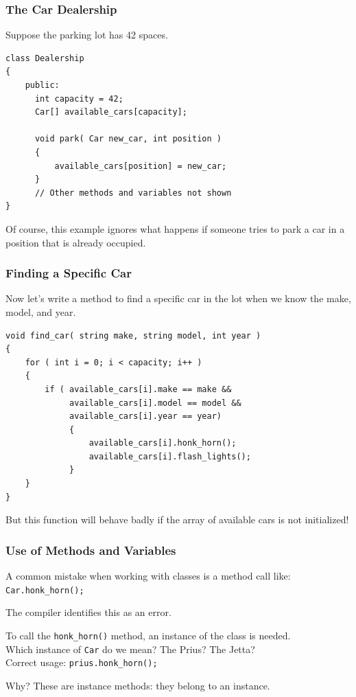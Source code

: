 \begin{frame}[fragile]
\frametitle{The Car Dealership}

Suppose the parking lot has 42 spaces.

\begin{verbatim}
class Dealership
{
    public:
      int capacity = 42;
      Car[] available_cars[capacity];

      void park( Car new_car, int position )
      {
          available_cars[position] = new_car;
      }
      // Other methods and variables not shown
}
\end{verbatim}

Of course, this example ignores what happens if someone tries to park a car in a position that is already occupied.

\end{frame}


\begin{frame}[fragile]
\frametitle{Finding a Specific Car}

Now let's write a method to find a specific car in the lot when we know the make, model, and year.

{\small
\begin{verbatim}
void find_car( string make, string model, int year )
{
    for ( int i = 0; i < capacity; i++ )
    {
        if ( available_cars[i].make == make &&
             available_cars[i].model == model &&
             available_cars[i].year == year)
             {
                 available_cars[i].honk_horn();
                 available_cars[i].flash_lights();
             }
    }
}
\end{verbatim}
}

But this function will behave badly if the array of available cars is not initialized!

\end{frame}



\begin{frame}
\frametitle{Use of Methods and Variables}
A common mistake when working with classes is a method call like:\\
\quad \texttt{Car.honk\_horn();}

The compiler identifies this as an error. 

To call the \texttt{honk\_horn()} method, an instance of the class is needed.\\
\quad Which instance of \texttt{Car} do we mean? The Prius? The Jetta?\\
\quad Correct usage: \texttt{prius.honk\_horn();}

Why? These are \alert{instance methods}: they belong to an instance. 


\end{frame}

